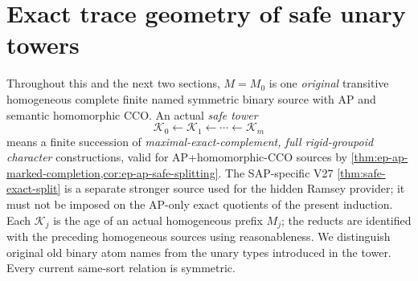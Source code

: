 \section{Exact trace geometry of safe unary towers}
\label{sec:ep-exact-traces}

Throughout this and the next two sections, \(M=M_0\) is one
\emph{original} transitive homogeneous complete finite named symmetric
binary source with AP and semantic homomorphic CCO.  An actual
\emph{safe tower}
\[
  \mathcal K_0\longleftarrow\mathcal K_1
  \longleftarrow\cdots\longleftarrow\mathcal K_m
  \tag{ET}\label{eq:ep-tower}
\]
means a finite succession of \emph{maximal-exact-complement,
full rigid-groupoid character} constructions, valid for
AP+homomorphic-CCO sources by
\cref{thm:ep-ap-marked-completion,cor:ep-ap-safe-splitting}.
The SAP-specific V27
\cref{thm:safe-exact-split} is a separate stronger source used
for the hidden Ramsey provider; it must not be imposed on
the AP-only exact quotients of the present induction.
Each \(\mathcal K_j\) is the age of an actual
homogeneous prefix \(M_j\); the reducts are identified with the
preceding homogeneous sources using reasonableness.  We distinguish
original old binary atom names from the unary types introduced in
the tower.  Every current same-sort relation is symmetric.

